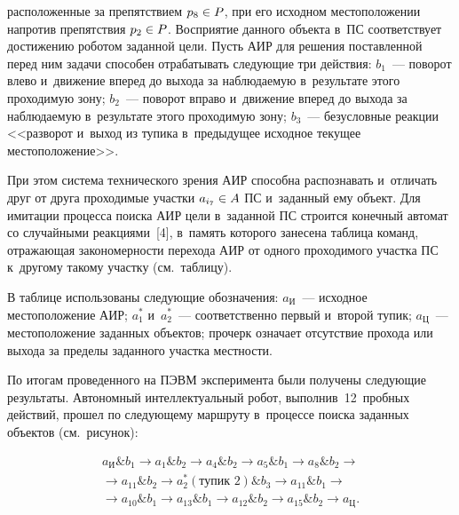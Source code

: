 \begin{multicols}{2}

\noindent
 расположенные за препятствием $p_8\hm\in P$, при его 
исходном местоположении напротив препятствия $p_2\hm\in P$. Восприятие 
данного объекта в~ПС соответствует достижению роботом 
заданной цели. Пусть АИР для решения по\-став\-лен\-ной перед ним задачи 
способен отрабатывать сле\-ду\-ющие три действия: $b_1$~--- поворот влево 
и~движение вперед до выхода за наблюдаемую в~результате этого проходимую 
зону; $b_2$~--- поворот вправо и~движение вперед до выхода за наблюдаемую 
в~результате этого проходимую зону; $b_3$~--- безуслов\-ные реакции 
<<разворот и~выход из тупика в~предыду\-щее исходное текущее 
местоположение>>.
  
  При этом система технического зрения АИР способна распознавать 
и~отличать друг от друга проходимые участки $a_{i_7}\hm\in A$ 
ПС и~заданный ему объект. Для имитации процесса поиска АИР цели 
в~заданной ПС строится конечный автомат со случайными 
реакциями~[4], в~память которого занесена таб\-ли\-ца команд, отражающая 
закономерности перехода АИР от одного проходимого участка ПС к~другому такому участку (см.\ таблицу). 
  

    
  В таблице использованы сле\-ду\-ющие обозначения: $a_{\mathrm{И}}$~--- 
исходное местоположение АИР; $a_1^*$ и~$a_2^*$~--- соответственно первый 
и~второй тупик; $a_{\mathrm{Ц}}$~--- местоположение заданных объектов; 
прочерк означает отсутствие прохода или выхода за пределы заданного участка 
мест\-ности. 
  
  По итогам проведенного на ПЭВМ эксперимента были получены сле\-ду\-ющие 
результаты. Автономный интеллектуальный робот, выполнив~12~пробных 
действий, прошел по сле\-ду\-юще\-му марш\-ру\-ту в~процессе поиска заданных 
объектов (см.\ рисунок):

\vspace*{-2pt}

\noindent
  \begin{multline*}
  a_{\mathrm{И}} \& b_1 \to a_1\& b_2 \to a_4 \& b_2\to a_5 \& b_1\to a_8 \&
  b_2\to{}\\
  {}\to  a_{11} \& b_2\to a_2^*(\mbox{тупик~2}) \& b_3\to a_{11} \& b_1\to{}\\
  {}\to  a_{10} \& b_1\to a_{13} \& b_1\to a_{12} \& b_2\to 
a_{15} \& b_2\to a_{\mathrm{Ц}}.
  \end{multline*}
  
  \vspace*{-2pt}
  

\end{multicols}
